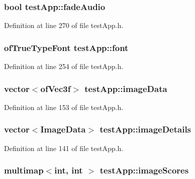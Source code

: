 \hypertarget{classtest_app_a918c09b5a4389a8402cfacb25d390226}{
\subsubsection[{fade\-Audio}]{\setlength{\rightskip}{0pt plus 5cm}bool test\-App\-::fade\-Audio}}\label{classtest_app_a918c09b5a4389a8402cfacb25d390226}


Definition at line 270 of file test\-App.\-h.

\hypertarget{classtest_app_a0fdf83c29e178256ee0c1a5b9ee81653}{
\subsubsection[{font}]{\setlength{\rightskip}{0pt plus 5cm}of\-True\-Type\-Font test\-App\-::font}}\label{classtest_app_a0fdf83c29e178256ee0c1a5b9ee81653}


Definition at line 254 of file test\-App.\-h.

\hypertarget{classtest_app_a500cd1228b3364bf30c8fb185e375688}{
\subsubsection[{image\-Data}]{\setlength{\rightskip}{0pt plus 5cm}vector$<$of\-Vec3f$>$ test\-App\-::image\-Data}}\label{classtest_app_a500cd1228b3364bf30c8fb185e375688}


Definition at line 153 of file test\-App.\-h.

\hypertarget{classtest_app_adcd4c3dfc7257326a79e6a3fc8b33406}{
\subsubsection[{image\-Details}]{\setlength{\rightskip}{0pt plus 5cm}vector$<${\bf Image\-Data}$>$ test\-App\-::image\-Details}}\label{classtest_app_adcd4c3dfc7257326a79e6a3fc8b33406}


Definition at line 141 of file test\-App.\-h.

\hypertarget{classtest_app_a9ced1a64554a911109fe8a975b95b590}{
\subsubsection[{image\-Scores}]{\setlength{\rightskip}{0pt plus 5cm}multimap$<$int, int $>$ test\-App\-::image\-Scores}}\label{classtest_app_a9ced1a64554a911109fe8a975b95b590}


